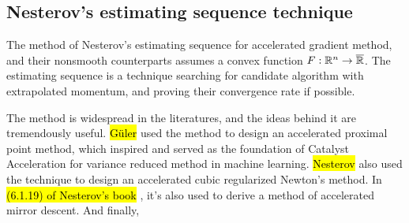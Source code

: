 \documentclass[12pt]{article}
\begin{document}
    \subsection{Nesterov's estimating sequence technique}
        The method of Nesterov's estimating sequence for accelerated gradient method, and their nonsmooth counterparts assumes a convex function $F: \mathbb R^n \rightarrow \overline{\mathbb R}$. 
        The estimating sequence is a technique searching for candidate algorithm with extrapolated momentum, and proving their convergence rate if possible. 
        \par
        The method is widespread in the literatures, and the ideas behind it are tremendously useful. 
        {\hl{Güler}} \cite{guler_new_1992}
        used the method to design an accelerated proximal point method, which inspired and served as the foundation of Catalyst Acceleration for variance reduced method in machine learning. 
        {\hl{Nesterov}} \cite{nesterov_accelerating_2008}
        also used the technique to design an accelerated cubic regularized Newton's method. 
        In 
        \hl{(6.1.19) of Nesterov's book }\cite{nesterov_lectures_2018}, 
        it's also used to derive a method of accelerated mirror descent. 
        And finally, 
\end{document}
